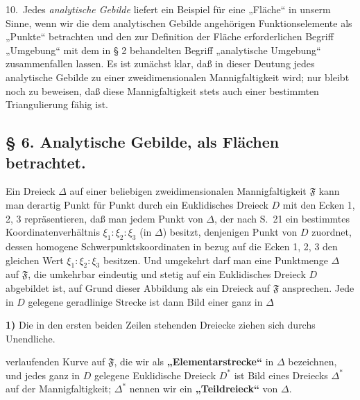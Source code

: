 \documentclass{article}
\begin{document}
10.\ Jedes \emph{analytische Gebilde} liefert ein Beispiel für eine „Fläche“ in unserm Sinne, wenn wir die dem analytischen Gebilde angehörigen Funktionselemente als „Punkte“ betrachten und den zur Definition der Fläche erforderlichen Begriff „Umgebung“ mit dem in § 2 behandelten Begriff „analytische Umgebung“ zusammenfallen lassen. Es ist zunächst klar, daß in dieser Deutung jedes analytische Gebilde zu einer zweidimensionalen Mannigfaltigkeit wird; nur bleibt noch zu beweisen, daß diese Mannigfaltigkeit stets auch einer bestimmten Triangulierung fähig ist.

\subsection*{§ 6. Analytische Gebilde, als Flächen betrachtet.}

Ein Dreieck $\Delta$ auf einer beliebigen zweidimensionalen Mannigfaltigkeit $\mathfrak{F}$ kann man derartig Punkt für Punkt durch ein Euklidisches Dreieck $D$ mit den Ecken 1, 2, 3 repräsentieren, daß man jedem Punkt von $\Delta$, der nach S.\ 21 ein bestimmtes Koordinatenverhältnis $\xi_1 : \xi_2 : \xi_3$ (in $\Delta$) besitzt, denjenigen Punkt von $D$ zuordnet, dessen homogene Schwerpunktskoordinaten in bezug auf die Ecken 1, 2, 3 den gleichen Wert $\xi_1 : \xi_2 : \xi_3$ besitzen. Und umgekehrt darf man eine Punktmenge $\Delta$ auf $\mathfrak{F}$, die umkehrbar eindeutig und stetig auf ein Euklidisches Dreieck $D$ abgebildet ist, auf Grund dieser Abbildung als ein Dreieck auf $\mathfrak{F}$ ansprechen. Jede in $D$ gelegene geradlinige Strecke ist dann Bild einer ganz in $\Delta$

\textbf{1)} Die in den ersten beiden Zeilen stehenden Dreiecke ziehen sich durchs Unendliche.

verlaufenden Kurve auf $\mathfrak{F}$, die wir als \textbf{„Elementarstrecke“} in $\Delta$ bezeichnen, und jedes ganz in $D$ gelegene Euklidische Dreieck $D^*$ ist Bild eines Dreiecks $\Delta^*$ auf der Mannigfaltigkeit; $\Delta^*$ nennen wir ein \textbf{„Teildreieck“} von $\Delta$.
\end{document}
